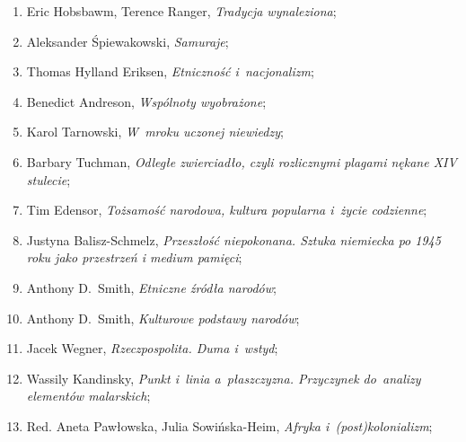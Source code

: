 \documentclass[a4paper,11pt]{article}
\begin{document}
\begin{enumerate}
\item Eric Hobsbawm, Terence Ranger, \textit{Tradycja wynaleziona};



\item Aleksander Śpiewakowski, \textit{Samuraje};



\item Thomas Hylland Eriksen, \textit{Etniczność i~nacjonalizm};



\item Benedict Andreson, \textit{Wspólnoty wyobrażone};



\item Karol Tarnowski, \textit{W~mroku uczonej niewiedzy};



\item Barbary Tuchman, \textit{Odległe zwierciadło, czyli rozlicznymi
    plagami nękane XIV stulecie};



\item Tim Edensor, \textit{Tożsamość narodowa, kultura popularna i~życie
    codzienne};



\item Justyna Balisz-Schmelz, \textit{Przeszłość niepokonana. Sztuka
    niemiecka po 1945 roku jako przestrzeń i medium pamięci};



\item Anthony D.~Smith, \textit{Etniczne źródła narodów};



\item Anthony D.~Smith, \textit{Kulturowe podstawy narodów};



\item Jacek Wegner, \textit{Rzeczpospolita. Duma i~wstyd};



\item Wassily Kandinsky, \textit{Punkt i~linia a~płaszczyzna. Przyczynek
    do~analizy elementów malarskich};



\item Red. Aneta Pawłowska, Julia Sowińska-Heim, \textit{Afryka
    i~(post)kolonializm};




\end{enumerate}
\end{document}
